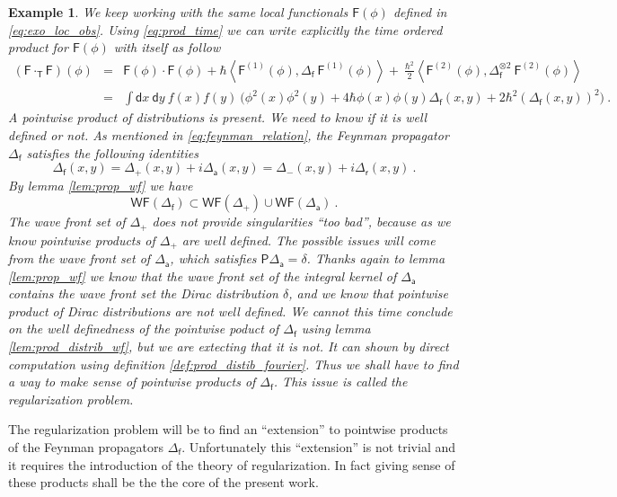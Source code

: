 \documentclass[11pt]{book}
\newcommand{\WF}{\mathsf{WF}}
\newcommand{\sm}[1]{\left\langle#1\right\rangle}
\newcommand{\Fsf}{\mathsf{F}}
\newcommand{\Psf}{\mathsf{P}}
\newcommand{\Tsf}{\mathsf{T}}
\newcommand{\asf}{\mathsf{a}}
\newcommand{\dsf}{\mathsf{d}}
\newcommand{\fsf}{\mathsf{f}}
\newcommand{\rsf}{\mathsf{r}}
\theoremstyle{break}
\newtheorem{example}{Example}[chapter]
\begin{document}
\begin{example}
 

We keep working with the same local functionals $\Fsf(\phi)$ defined in \eqref{eq:exo_loc_obs}. Using \eqref{eq:prod_time} we can write explicitly the time ordered product for $\Fsf(\phi)$ with itself as follow
%
\begin{eqnarray*}
(\Fsf \cdot_\Tsf \Fsf)(\phi) &=& \Fsf(\phi) \cdot \Fsf(\phi) + \hbar \sm{ \Fsf^{(1)}(\phi) , \Delta_\fsf \ \Fsf^{(1)}(\phi) } + \ \frac{\hbar^2}{2} \sm{ \Fsf^{(2)}(\phi) , \Delta_\fsf^{\otimes 2} \ \Fsf^{(2)}(\phi)} \\
%
&=& \int \dsf x \ \dsf y \ f(x) f(y) \ \bigg( \phi^2(x) \phi^2(y) + 4 \hbar \phi(x) \phi(y) \Delta_\fsf(x,y) + 2 \hbar^2 \left(\Delta_\fsf(x,y)\right)^2 \bigg) \ .
\end{eqnarray*}
%
A pointwise product of distributions is present. We need to know if it is well defined or not. As mentioned in \eqref{eq:feynman_relation}, the Feynman propagator $\Delta_\fsf$ satisfies the following identities
%
\begin{equation}
\Delta_\fsf(x,y) = \Delta_+(x,y) + i \Delta_\asf(x,y) = \Delta_-(x,y) + i \Delta_\rsf(x,y) \ .
\label{eq:conv_feynman_prop}
\end{equation}
%
By lemma \ref{lem:prop_wf} we have
%
\begin{equation*}
\WF(\Delta_\fsf) \subset \WF(\Delta_+) \cup \WF(\Delta_\asf) \ .
\end{equation*}
%
The wave front set of $\Delta_+$ does not provide singularities ``too bad'', because as we know pointwise products of $\Delta_+$ are well defined. The possible issues will come from the wave front set of $\Delta_\asf$, which satisfies $\Psf \Delta_\asf = \delta$. Thanks again to lemma \ref{lem:prop_wf} we know that the wave front set of the integral kernel of $\Delta_\asf$ contains the wave front set the Dirac distribution $\delta$, and we know that pointwise product of Dirac distributions are not well defined. We cannot this time conclude on the well definedness of the pointwise poduct of $\Delta_\fsf$ using lemma \ref{lem:prod_distrib_wf}, but we are extecting that it is not. It can shown by direct computation using definition \ref{def:prod_distib_fourier}. Thus we shall have to find a way to make sense of pointwise products of $\Delta_\fsf$. This issue is called the regularization problem.
\end{example}


The regularization problem will be to find an ``extension'' to pointwise products of the Feynman propagators $\Delta_\fsf$. Unfortunately this ``extension'' is not trivial and it requires the introduction of the theory of regularization. In fact giving sense of these products shall be the the core of the present work.
\end{document}
